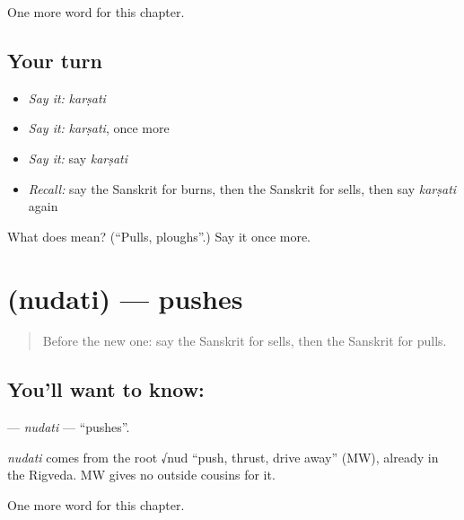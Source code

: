 \begin{grammarlens}[title={What you've built}]
One more word for this chapter.
\end{grammarlens}

\subsection*{Your turn}
\begin{itemize}
\raggedright
  \item \emph{Say it:} \emph{karṣati}
  \item \emph{Say it:} \emph{karṣati}, once more
  \item \emph{Say it:} say \emph{karṣati}
  \item \emph{Recall:} say the Sanskrit for burns, then the Sanskrit for sells, then say \emph{karṣati} again
\end{itemize}

\begin{tcolorbox}[breakable,colback=teal!4,colframe=teal!35!black,title={Before you move on}]
What does  mean? (\textquotedblleft{}Pulls, ploughs\textquotedblright{}.) Say it once more.
\end{tcolorbox}
\section[\texorpdfstring{\sk{नुदति} (nudati)}{नुदति (nudati)}]{ (nudati) — pushes}

\label{lesson:SA-C138-nudati}



\begin{quote}
Before the new one: say the Sanskrit for sells, then the Sanskrit for pulls.
\end{quote}

\subsection*{You'll want to know: }
\textbf{} — \emph{nudati} — \textquotedblleft{}pushes\textquotedblright{}.

\begin{cousinweb}
\emph{nudati} comes from the root √nud \textquotedblleft{}push, thrust, drive away\textquotedblright{} (MW), already in the Rigveda. MW gives no outside cousins for it.
\end{cousinweb}

\begin{grammarlens}[title={What you've built}]
One more word for this chapter.
\end{grammarlens}

